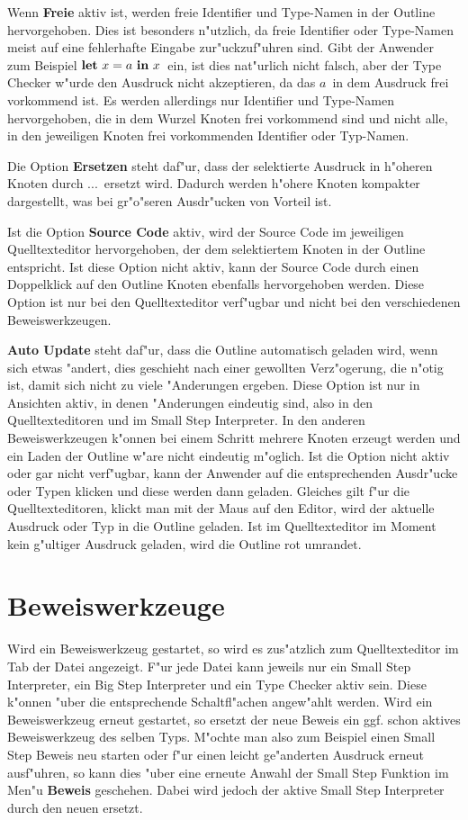 Wenn {\bf Freie} aktiv ist, werden freie Identifier und Type-Namen in der
Outline hervorgehoben. Dies ist besonders n"utzlich, da freie Identifier
oder Type-Namen meist auf eine fehlerhafte Eingabe zur"uckzuf"uhren sind.
Gibt der Anwender zum Beispiel \glqq$\textbf{let}\ x = a\ \textbf{in}\ x$\grqq\ ein, ist 
dies nat"urlich nicht falsch, aber der Type Checker w"urde den Ausdruck
nicht akzeptieren, da das \glqq$a$\grqq\ in dem Ausdruck frei 
vorkommend ist. Es werden allerdings nur Identifier und Type-Namen
hervorgehoben, die in dem Wurzel Knoten frei vorkommend sind und nicht
alle, in den jeweiligen Knoten frei vorkommenden Identifier oder Typ-Namen.

Die Option {\bf Ersetzen} steht daf"ur, dass der selektierte Ausdruck
in h"oheren Knoten durch \glqq...\grqq\ ersetzt wird. Dadurch
werden h"ohere Knoten kompakter dargestellt, was bei gr"o"seren Ausdr"ucken
von Vorteil ist.

Ist die Option {\bf Source Code} aktiv, wird der Source Code im jeweiligen
Quelltexteditor hervorgehoben, der dem selektiertem Knoten in der Outline
entspricht. Ist diese Option nicht aktiv, kann der Source Code durch einen
Doppelklick auf den Outline Knoten ebenfalls hervorgehoben werden. Diese
Option ist nur bei den Quelltexteditor verf"ugbar und nicht bei den
verschiedenen Beweiswerkzeugen.

{\bf Auto Update} steht daf"ur, dass die Outline automatisch geladen wird,
wenn sich etwas "andert, dies geschieht nach einer gewollten Verz"ogerung,
die n"otig ist, damit sich nicht zu viele "Anderungen ergeben. Diese Option
ist nur in Ansichten aktiv, in denen "Anderungen eindeutig sind, also in den
Quelltexteditoren und im Small Step Interpreter. In den anderen
Beweiswerkzeugen k"onnen bei einem Schritt mehrere Knoten erzeugt werden
und ein Laden der Outline w"are nicht eindeutig m"oglich.
Ist die Option nicht aktiv oder gar nicht verf"ugbar, kann der Anwender auf 
die entsprechenden Ausdr"ucke oder Typen klicken und diese werden dann geladen.
Gleiches gilt f"ur die Quelltexteditoren, klickt man mit der Maus auf den
Editor, wird der aktuelle Ausdruck oder Typ in die Outline geladen. Ist im
Quelltexteditor im Moment kein g"ultiger Ausdruck geladen, wird die Outline
rot umrandet.


\section {Beweiswerkzeuge}
\label{Beweiswerkzeuge} Wird ein Beweiswerkzeug gestartet, so wird
es zus"atzlich zum Quelltexteditor im Tab der Datei angezeigt. F"ur
jede Datei kann jeweils nur ein Small Step Interpreter, ein Big Step
Interpreter und ein Type Checker aktiv sein. Diese k"onnen "uber die
entsprechende Schaltfl"achen angew"ahlt werden. Wird ein
Beweiswerkzeug erneut gestartet, so ersetzt der neue Beweis ein ggf.
schon aktives Beweiswerkzeug des selben Typs. M"ochte man also zum
Beispiel einen Small Step Beweis neu starten oder f"ur einen leicht
ge"anderten Ausdruck erneut ausf"uhren, so kann dies "uber eine
erneute Anwahl der Small Step Funktion im Men"u {\bf Beweis}
geschehen. Dabei wird jedoch der aktive Small Step Interpreter durch
den neuen ersetzt.


